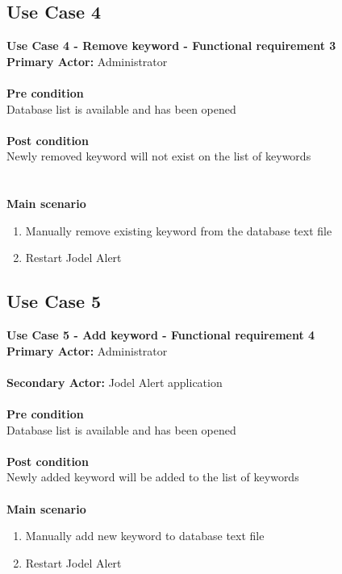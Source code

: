 \documentclass[a4paper,12pt]{article}
\begin{document}
\subsection{Use Case 4}
\textbf{Use Case 4 - Remove keyword - Functional requirement 3}\\
\textbf{Primary Actor:}
Administrator\\\\
\textbf{Pre condition}\\
Database list is available and has been opened\\\\
\textbf{Post condition}\\
Newly removed keyword will not exist on the list of keywords\\\\\\
\textbf{Main scenario}
\begin{enumerate}
	\item Manually remove existing keyword from the database text file
	\item Restart Jodel Alert
\end{enumerate}

\subsection{Use Case 5}
\textbf{Use Case 5 - Add keyword - Functional requirement 4}\\
\textbf{Primary Actor:}
Administrator\\\\
\textbf{Secondary Actor:}
Jodel Alert application\\\\
\textbf{Pre condition}\\
Database list is available and has been opened\\\\
\textbf{Post condition}\\
Newly added keyword will be added to the list of keywords\\\\
\textbf{Main scenario}
\begin{enumerate}
	\item Manually add new keyword to database text file
	\item Restart Jodel Alert
\end{enumerate}
\end{document}
